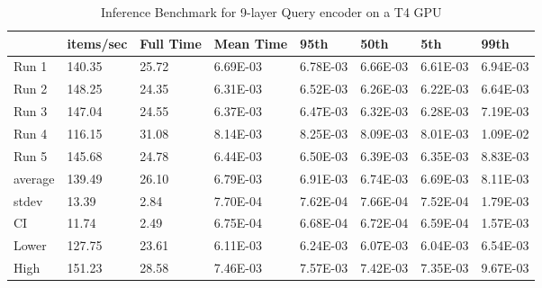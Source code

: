 \begin{table*}[!ht]
    \centering
    \begin{tabular}{|l|l|l|l|l|l|l|l|}
    \hline
        ~ & items/sec & Full Time & Mean Time & 95th & 50th & 5th & 99th \\ \hline
        Run 1 & 140.35 & 25.72 & 6.69E-03 & 6.78E-03 & 6.66E-03 & 6.61E-03 & 6.94E-03 \\ \hline
        Run 2 & 148.25 & 24.35 & 6.31E-03 & 6.52E-03 & 6.26E-03 & 6.22E-03 & 6.64E-03 \\ \hline
        Run 3 & 147.04 & 24.55 & 6.37E-03 & 6.47E-03 & 6.32E-03 & 6.28E-03 & 7.19E-03 \\ \hline
        Run 4 & 116.15 & 31.08 & 8.14E-03 & 8.25E-03 & 8.09E-03 & 8.01E-03 & 1.09E-02 \\ \hline
        Run 5 & 145.68 & 24.78 & 6.44E-03 & 6.50E-03 & 6.39E-03 & 6.35E-03 & 8.83E-03 \\ \hline
        average & 139.49 & 26.10 & 6.79E-03 & 6.91E-03 & 6.74E-03 & 6.69E-03 & 8.11E-03 \\ \hline
        stdev & 13.39 & 2.84 & 7.70E-04 & 7.62E-04 & 7.66E-04 & 7.52E-04 & 1.79E-03 \\ \hline
        CI & 11.74 & 2.49 & 6.75E-04 & 6.68E-04 & 6.72E-04 & 6.59E-04 & 1.57E-03 \\ \hline
        Lower & 127.75 & 23.61 & 6.11E-03 & 6.24E-03 & 6.07E-03 & 6.04E-03 & 6.54E-03 \\ \hline
        High & 151.23 & 28.58 & 7.46E-03 & 7.57E-03 & 7.42E-03 & 7.35E-03 & 9.67E-03 \\ \hline
    \end{tabular}
    \caption{Inference Benchmark for 9-layer Query encoder on a T4 GPU}
    \label{tab:benchmark-gpu-9layer}
\end{table*}

